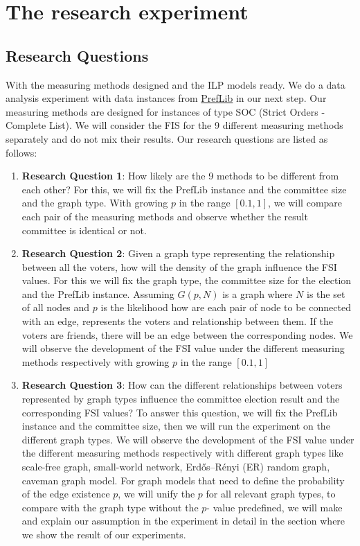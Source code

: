 \documentclass{article}
\begin{document}
\section{The research experiment}

\subsection{Research Questions}
With the measuring methods designed and the ILP models ready. We do a data analysis experiment with data instances from \href{https://www.preflib.org/}{PrefLib} in our next step. Our measuring methods are designed for instances of type SOC (Strict Orders - Complete List). We will consider the FIS for the 9 different measuring methods separately and do not mix their results. Our research questions are listed as follows:
\begin{enumerate}
    \item \textbf{Research Question 1}: How likely are the 9 methods to be different from each other?
        \newline
    For this, we will fix the PrefLib instance and the committee size and the graph type. With growing $p$ in the range $[0.1,1]$, we will compare each pair of the measuring methods and observe whether the result committee is identical or not.
    \item \textbf{Research Question 2}: Given a graph type representing the relationship between all the voters, how will the density of the graph influence the FSI values. 
    \newline
    For this we will fix the graph type, the committee size for the election and the PrefLib instance. Assuming $G(p,N)$ is a graph where $N$ is the set of all nodes and  $p$ is the likelihood how are each pair of node to be connected with an edge, represents the voters and relationship between them. If the voters are friends, there will be an edge between the corresponding nodes. We will observe the development of the FSI value under the different measuring methods respectively with growing $p$ in the range $[0.1,1]$
    
    \item \textbf{Research Question 3}: How can the different relationships between voters represented by graph types influence the committee election result and the corresponding FSI values?
    \newline
    To answer this question, we will fix the PrefLib instance and the committee size, then we will run the experiment on the different graph types. We will observe the development of the FSI value under the different measuring methods respectively with different graph types like scale-free graph, small-world network, Erdős–Rényi (ER) random graph, caveman graph model. For graph models that need to define the probability of the edge existence $p$, we will unify the $p$ for all relevant graph types, to compare with the graph type without the $p$- value predefined, we will make and explain our assumption in the experiment in detail in the section where we show the result of our experiments.
    

\end{enumerate}
\end{document}
